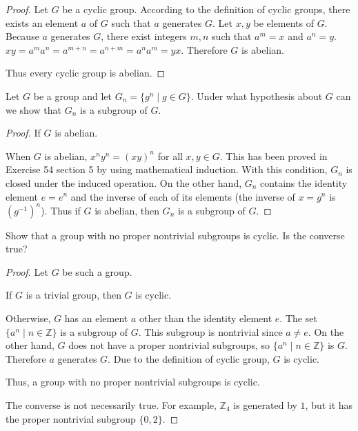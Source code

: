 \begin{proof}
    Let $G$ be a cyclic group. According to the definition of cyclic groups, there exists an element $a$ of $G$ such that $a$ generates $G$. Let $x, y$ be elements of $G$. Because $a$ generates $G$, there exist integers $m, n$ such that $a^{m} = x$ and $a^{n} = y$. $xy = a^{m}a^{n} = a^{m+n} = a^{n+m} = a^{n}a^{m} = yx$. Therefore $G$ is abelian.

    Thus every cyclic group is abelian.
\end{proof}

\newpage
\begin{exercise}
    Let $G$ be a group and let $G_{n} = \{ g^{n} \mid g\in G \}$. Under what hypothesis about $G$ can we show that $G_{n}$ is a subgroup of $G$.
\end{exercise}

\begin{proof}
    If $G$ is abelian.

    When $G$ is abelian, $x^{n}y^{n} = {(xy)}^{n}$ for all $x, y\in G$. This has been proved in Exercise 54 section 5 by using mathematical induction. With this condition, $G_{n}$ is closed under the induced operation. On the other hand, $G_{n}$ contains the identity element $e = e^{n}$ and the inverse of each of its elements (the inverse of $x = g^{n}$ is ${(g^{-1})}^{n}$). Thus if $G$ is abelian, then $G_{n}$ is a subgroup of $G$.
\end{proof}

\newpage
\begin{exercise}
    Show that a group with no proper nontrivial subgroups is cyclic. Is the converse true?
\end{exercise}

\begin{proof}
    Let $G$ be such a group.

    If $G$ is a trivial group, then $G$ is cyclic.

    Otherwise, $G$ has an element $a$ other than the identity element $e$. The set $\{ a^{n} \mid n\in\mathbb{Z} \}$ is a subgroup of $G$. This subgroup is nontrivial since $a\ne e$. On the other hand, $G$ does not have a proper nontrivial subgroups, so $\{ a^{n} \mid n\in\mathbb{Z} \}$ is $G$. Therefore $a$ generates $G$. Due to the definition of cyclic group, $G$ is cyclic.

    Thus, a group with no proper nontrivial subgroups is cyclic.

    The converse is not necessarily true. For example, $\mathbb{Z}_{4}$ is generated by $1$, but it has the proper nontrivial subgroup $\{ 0, 2 \}$.
\end{proof}


